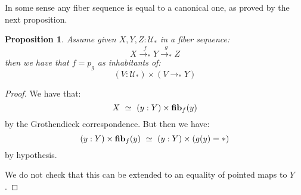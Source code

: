 \documentclass{article}
\newcommand{\U}{{\mathcal U}}
\renewcommand{\r}{\rightarrow}
\newcommand{\refl}{\mathrm{refl}}
\newcommand{\id}{\mathrm{\bf id}}
\newcommand{\fib}{\mathrm{\bf fib}}
\newtheorem{proposition}{Proposition}
\newcommand{\comment}[1]{}
\begin{document}
In some sense any fiber sequence is equal to a canonical one, as proved by the next proposition.

\begin{proposition}
Assume given $X,Y,Z:\U_*$ in a fiber sequence:
\[X \overset{f}{\r_*} Y\overset{g}{\r_*} Z\]
then we have that $f=p_g$ as inhabitants of:
\[(V : \U_*)\times (V\r_* Y)\]%
\end{proposition}
\begin{proof}
We have that: 
\[X\ \simeq\ (y:Y)\times \fib_f(y)\]
by the Grothendieck correspondence. But then we have:
 \[(y:Y)\times \fib_f(y) \ \simeq\ (y:Y)\times (g(y)=*)\]
 by hypothesis.
 
We do not check that this can be extended to an equality of pointed maps to $Y$.
\end{proof}



\comment{
In order to understand this definition better, we make it explicit for sets. Note that next proposition is not an equivalence between types.

\begin{proposition}
A sequence of pointed sets:
\[X \overset{f}{\r_*} Y\overset{g}{\r_*} Z\] 
is a fiber sequence if and only if for all $y:Y$, we have:
\[\fib_f(y)\simeq (g(y)=*) \]
\end{proposition}
\begin{proof}
If $f,g$ form a fiber sequence, we can assume it is a canonical one. In this situation one need to show for $y:Y$ that:
\[\fib_{p_g}(y)\simeq(g(y)=*)\]
This is true by the Grothendieck correspondence.

For the converse assume: 
\[\epsilon : \big((x:X)\times (f(x)=y)\big)\r  (g(y)=*) \]
an equivalence. We want to show $f = p_1$. We build an equality directly. 
\begin{itemize}
\item We build a map $\psi$ from $X$ to $\fib_g$, defined by:
\[\psi(x) \, :\equiv\, (f(x),\epsilon(x,\refl_{f(x)}))\]
It is a pointed map, and we have $p_g\circ \psi =_{X\r_* Y} f$ (exercise: prove this).
\item We define $\phi$ the other way by:
\[\phi(y,p) \, :\equiv\, p_1(\epsilon^{-1}(p))\]
\item Now we check that $\phi(\psi(x)) =_X x$ indeed $\phi(\psi(x))$ is defined as:
\[p_1(\epsilon^{-1}\epsilon(x,\refl_{f(x)}))\]
which is equal to $x$.
\item In order to show $\psi\circ\phi \sim \id$, by induction it is enough to prove:
\[\psi(\phi(y,q)) = (y,q)\]
For $y:Y$ and $q:f(y)=*$. This means:
\[\phi(p_1(\epsilon^{-1}(q))) = (y,q)\]
Since $f(y)=*$ is a proposition, it is enough to prove:
\[f(p_1(\epsilon^{-1}(q))) = y\]
but this is the second component of $\epsilon^{-1}(q)$.
\end{itemize}
\end{proof}}
\end{document}
